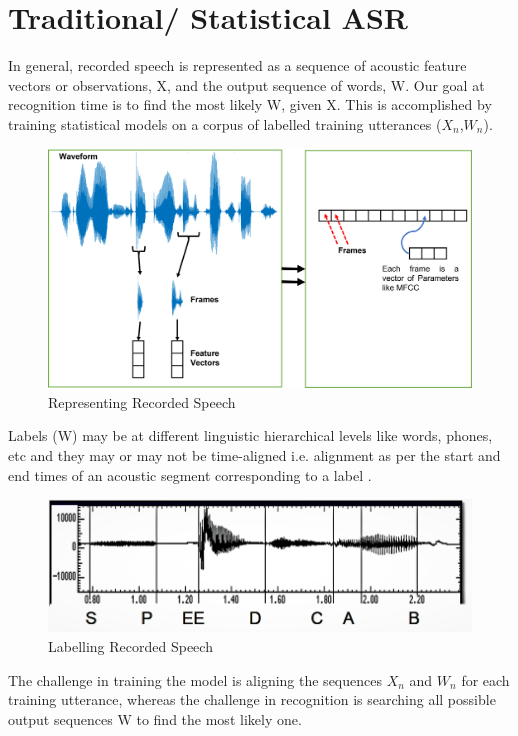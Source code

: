 \newpage

\section{Traditional/ Statistical ASR} 
\label{sec:traditional-asr}

In general, recorded speech is represented as a sequence of acoustic feature vectors or observations, X, and the output sequence of words, W. Our goal at recognition time is to find the most likely W, given X. This is accomplished by training statistical models on a corpus of labelled training utterances ($X_{n}$,$W_{n}$).
\newline
\begin{figure}[ht!]
    \centering
    \includegraphics[width=1.0\textwidth]{img/recordedspeechrep.png}
    \caption{Representing Recorded Speech}
    \label{fig:Representing-Recorded-Speech}
\end{figure}
 \newline
Labels (W) may be at different linguistic hierarchical levels like words, phones, etc and they may or may not be time-aligned i.e. alignment as per the start and end times of an acoustic segment corresponding to a label \cite{jurafsky_speech_2009}.
\begin{figure}[ht!]
    \centering
    \includegraphics[scale=0.6]{img/speech label.png}
    \caption{Labelling Recorded Speech}
    \label{fig:labelling-recorded-speech2}
\end{figure}
\newline
The challenge in training the model is aligning the sequences $X_{n}$ and $W_{n}$ for each training utterance, whereas the challenge in recognition is searching all possible output sequences W to find the most likely one.

